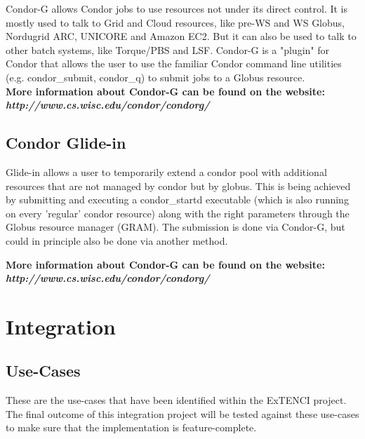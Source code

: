     Condor-G allows Condor jobs to use resources not under its direct
    control. It is mostly used to talk to Grid and Cloud resources, like
    pre-WS and WS Globus, Nordugrid ARC, UNICORE and Amazon EC2. But it
    can also be used to talk to other batch systems, like Torque/PBS and
    LSF. Condor-G is a "plugin" for Condor that allows the user to use
    the familiar Condor command line utilities  (e.g. condor\_submit,
    condor\_q) to submit jobs to a Globus resource.\\[1em]
   
  
   
    \textbf{More information about Condor-G can be found on the
    website: \\ \textit{http://www.cs.wisc.edu/condor/condorg/}}
   
   \vfill %
    


    
	
    \subsection{Condor Glide-in}
    Glide-in allows a user to temporarily extend a condor pool with
    additional resources that are not managed by condor but by globus.
    This is being achieved by submitting and executing a condor\_startd
    executable (which is also running on every 'regular' condor
    resource) along with the right parameters through the Globus
    resource manager (GRAM). The submission is done via Condor-G, but
    could in principle also be done via another method.

    \textbf{More information about Condor-G can be found on the
    website: \\ \textit{http://www.cs.wisc.edu/condor/condorg/}}

    \pagebreak

\section {Integration}

    \subsection{Use-Cases} These are the use-cases that have been
    identified within the ExTENCI project. The final outcome of this
    integration project will be tested against these use-cases to make
    sure that the implementation is feature-complete.

